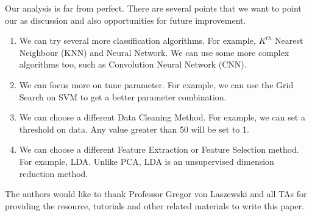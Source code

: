 \documentclass[sigconf]{acmart}
\begin{document}
Our analysis is far from perfect. There are several points that we want to point our as discussion and also opportunities for future improvement.
\begin{enumerate}
    \item We can try several more classification algorithms. For example, $K^{th}$ Nearest Neighbour (KNN) and Neural Network. We can use some more complex algorithms too, such as Convolution Neural Network (CNN).
    \item We can focus more on tune parameter. For example, we can use the Grid Search on SVM to get a better parameter combination.
    \item We can choose a different Data Cleaning Method. For example, we can set a threshold on data. Any value greater than 50 will be set to 1.
    \item We can choose a different Feature Extraction or Feature Selection method. For example, LDA. Unlike PCA, LDA is an unsupervised dimension reduction method. 
\end{enumerate}


\begin{acks}

The authors would like to thank Professor Gregor von Laszewski and all TAs for providing the resource, tutorials and other related materials to write this paper.

\end{acks}





\appendix
\end{document}
